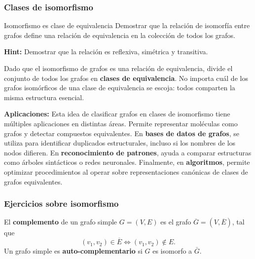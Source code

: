 \subsubsection{Clases de isomorfismo}

\begin{thmblock}{Isomorfismo es clase de equivalencia}
Demostrar que la relaci\'on de isomorf\'ia entre grafos define una relaci\'on de equivalencia en la colecci\'on de todos los grafos.

\textbf{Hint:} Demostrar que la relaci\'on es reflexiva, sim\'etrica y transitiva.
\end{thmblock}



\medskip

Dado que el isomorfismo de grafos es una relaci\'on de equivalencia, divide el conjunto de todos los grafos en \textbf{clases de equivalencia}.
No importa cu\'al de los grafos isom\'orficos de una clase de equivalencia se escoja: todos comparten la misma estructura esencial.

\textbf{Aplicaciones:} Esta idea de clasificar grafos en clases de isomorfismo tiene múltiples aplicaciones en distintas áreas. Permite representar moléculas como grafos y detectar compuestos equivalentes. En \textbf{bases de datos de grafos}, se utiliza para identificar duplicados estructurales, incluso si los nombres de los nodos difieren. En \textbf{reconocimiento de patrones}, ayuda a comparar estructuras como árboles sintácticos o redes neuronales. Finalmente, en \textbf{algoritmos}, permite optimizar procedimientos al operar sobre representaciones canónicas de clases de grafos equivalentes.

\subsubsection{Ejercicios sobre isomorfismo}

El \textbf{complemento} de un grafo simple $G = (V,E)$ es el grafo $\overline G = (V,\overline E)$, tal que
\[(v_1,v_2) \in \overline{E} \Leftrightarrow (v_1,v_2) \not \in E.\]
Un grafo simple es \textbf{auto-complementario} si $G$ es isomorfo a $\bar G$.


